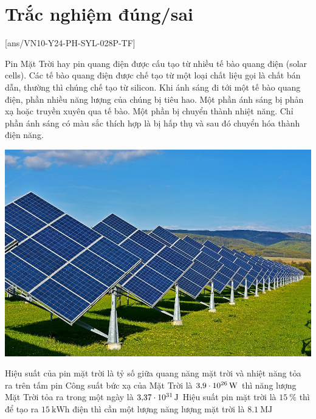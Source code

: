 \section{Trắc nghiệm đúng/sai}
\setcounter{ex}{0}
[ans/VN10-Y24-PH-SYL-028P-TF]
\begin{ex}
	Pin Mặt Trời hay pin quang điện được cấu tạo từ nhiều tế bào quang điện (solar cells). Các tế bào quang điện được chế tạo từ một loại chất liệu gọi là chất bán dẫn, thường thì chúng chế tạo từ silicon. Khi ánh sáng đi tới một tế bào quang điện, phần nhiều năng lượng của chúng bị tiêu hao. Một phần ánh sáng bị phản xạ hoặc truyền xuyên qua tế bào. Một phần bị chuyển thành nhiệt năng. Chỉ phần ánh sáng có màu sắc thích hợp là bị hấp thụ và sau đó chuyển hóa thành điện năng.
	\begin{center}
		\includegraphics[width=0.4\linewidth]{../figs/VN10-2023-PH-TP028-1}
	\end{center}
	{Hiệu suất của pin mặt trời là tỷ số giữa quang năng mặt trời và nhiệt năng tỏa ra trên tấm pin}
	{\True Công suất bức xạ của Mặt Trời là $\SI{3.9E26}{\watt}$ thì  năng lượng Mặt Trời tỏa ra trong một ngày là $\SI{3.37E31}{\joule}$}
	{\True Hiệu suất pin mặt trời là $\SI{15}{\percent}$ thì để tạo ra $\SI{15}{\kilo\watt\hour}$ điện thì cần một lượng năng lượng mặt trời là $\SI{8.1}{\mega\joule}$
	}
	\loigiai{}
\end{ex}
